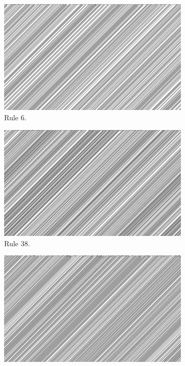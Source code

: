 \documentclass[12pt]{article}
\begin{document}
\begin{figure} [!h]
\begin{subfigure}{.5\textwidth}
  \centering
  \includegraphics[width=.9\linewidth]{rule6}
  \caption{Rule 6.}
  \label{fig:rule6}
\end{subfigure}%
\begin{subfigure}{.5\textwidth}
  \centering
  \includegraphics[width=.9\linewidth]{rule38}
  \caption{Rule 38.}
  \label{fig:rule38}
\end{subfigure}
\begin{subfigure}{.5\textwidth}
  \centering
  \includegraphics[width=.9\linewidth]{rule134}

\end{subfigure}
\end{figure}
\end{document}
